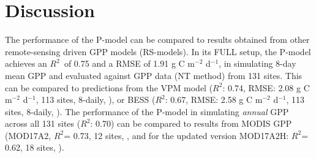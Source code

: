 \documentclass{myreport}
\newcommand{\rsq}{$R^2$}
\begin{document}

\section{Discussion}
\label{sec:discussion}

The performance of the P-model can be compared to results obtained from other remote-sensing driven GPP models (RS-models). In its FULL setup, the P-model achieves an \rsq\ of 0.75 and a RMSE of 1.91 g C m$^{-2}$ d$^{-1}$, in simulating 8-day mean GPP and evaluated against GPP data (NT method) from 131 sites. This can be compared to predictions from the VPM model (\rsq : 0.74, RMSE: 2.08 g C m$^{-2}$ d$^{-1}$, 113 sites, 8-daily, \citet{Zhang2017-yr}), or BESS (\rsq : 0.67, RMSE: 2.58 g C m$^{-2}$ d$^{-1}$, 113 sites, 8-daily, \citet{jiang16rse}). The performance of the P-model in simulating \textit{annual} GPP across all 131 sites (\rsq : 0.70) can be compared to results from MODIS GPP (MOD17A2, \rsq = 0.73, 12 sites, \citet{heinsch06}, and for the updated version MOD17A2H: \rsq = 0.62, 18 sites, \citet{wang17rs}). 
\end{document}
